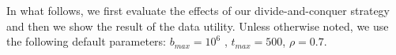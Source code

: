 

In what follows, we first evaluate the effects of our divide-and-conquer
strategy and then we show the result of the data utility. Unless otherwise
noted, we use the following default parameters: $b_{max} = 10^6$ ,
$t_{max}=500$, $\rho =0.7$.


%

